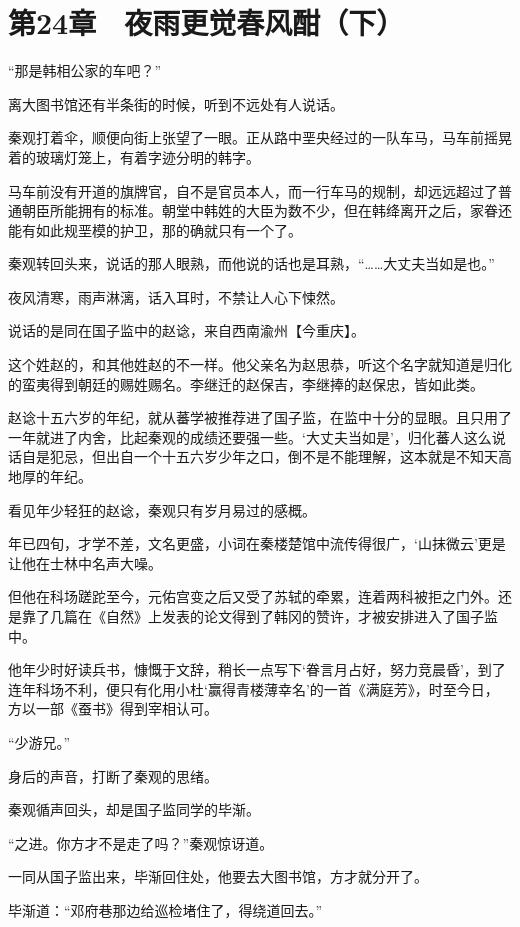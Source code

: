 \section{第24章　夜雨更觉春风酣（下）}

“那是韩相公家的车吧？”

离大图书馆还有半条街的时候，听到不远处有人说话。

秦观打着伞，顺便向街上张望了一眼。正从路中垩央经过的一队车马，马车前摇晃着的玻璃灯笼上，有着字迹分明的韩字。

马车前没有开道的旗牌官，自不是官员本人，而一行车马的规制，却远远超过了普通朝臣所能拥有的标准。朝堂中韩姓的大臣为数不少，但在韩绛离开之后，家眷还能有如此规垩模的护卫，那的确就只有一个了。

秦观转回头来，说话的那人眼熟，而他说的话也是耳熟，“……大丈夫当如是也。”

夜风清寒，雨声淋漓，话入耳时，不禁让人心下悚然。

说话的是同在国子监中的赵谂，来自西南渝州【今重庆】。

这个姓赵的，和其他姓赵的不一样。他父亲名为赵思恭，听这个名字就知道是归化的蛮夷得到朝廷的赐姓赐名。李继迁的赵保吉，李继捧的赵保忠，皆如此类。

赵谂十五六岁的年纪，就从蕃学被推荐进了国子监，在监中十分的显眼。且只用了一年就进了内舍，比起秦观的成绩还要强一些。‘大丈夫当如是’，归化蕃人这么说话自是犯忌，但出自一个十五六岁少年之口，倒不是不能理解，这本就是不知天高地厚的年纪。

看见年少轻狂的赵谂，秦观只有岁月易过的感概。

年已四旬，才学不差，文名更盛，小词在秦楼楚馆中流传得很广，‘山抹微云’更是让他在士林中名声大噪。

但他在科场蹉跎至今，元佑宫变之后又受了苏轼的牵累，连着两科被拒之门外。还是靠了几篇在《自然》上发表的论文得到了韩冈的赞许，才被安排进入了国子监中。

他年少时好读兵书，慷慨于文辞，稍长一点写下‘眷言月占好，努力竞晨昏’，到了连年科场不利，便只有化用小杜‘赢得青楼薄幸名’的一首《满庭芳》，时至今日，方以一部《蚕书》得到宰相认可。

“少游兄。”

身后的声音，打断了秦观的思绪。

秦观循声回头，却是国子监同学的毕渐。

“之进。你方才不是走了吗？”秦观惊讶道。

一同从国子监出来，毕渐回住处，他要去大图书馆，方才就分开了。

毕渐道：“邓府巷那边给巡检堵住了，得绕道回去。”

